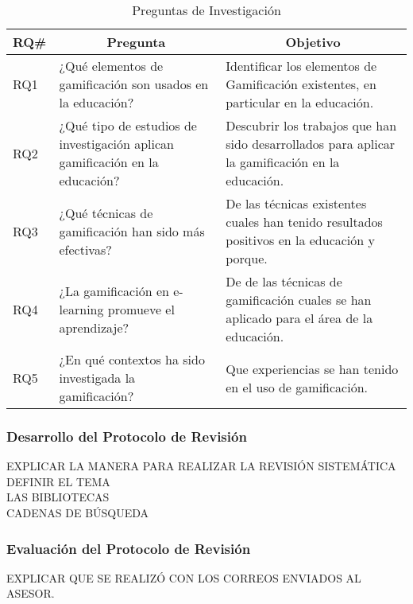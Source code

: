 \documentclass[fleqn,10pt]{SelfArx} %
\begin{document}
\begin{table}
    \begin{center}
        \caption{Preguntas de Investigación}
        \label{table:researchQuestions}
        \begin{tabular}{| p{0.6cm} | p{3.5cm} | p{3.5cm} |}
            \toprule
            \hline
            \multicolumn{1}{|c|}{\textbf{RQ\#}} & \multicolumn{1}{|c|}{\textbf{Pregunta}}  & \multicolumn{1}{|c|}{\textbf{Objetivo}} \\
            \hline
            RQ1 & ¿Qué elementos de gamificación son usados en la educación? & Identificar los elementos de Gamificación existentes, en particular en la educación. \\
            \hline
            RQ2 & ¿Qué tipo de estudios de investigación aplican gamificación en la educación? & Descubrir los trabajos que han sido desarrollados para aplicar la gamificación en la educación. \\
            \hline
            RQ3 & ¿Qué técnicas de gamificación han sido más efectivas? & De las técnicas existentes cuales han tenido resultados positivos en la educación y porque. \\
            \hline
            RQ4 & ¿La gamificación en e-learning promueve el aprendizaje? & De de las técnicas de gamificación cuales se han aplicado para el área de la educación.\\
            \hline
            RQ5 & ¿En qué contextos ha sido investigada la gamificación? & Que experiencias se han tenido en el uso de gamificación.\\
            \hline
        \end{tabular}
    \end{center}
\end{table}

    \subsubsection{Desarrollo del Protocolo de Revisión}
    EXPLICAR LA MANERA PARA REALIZAR LA REVISIÓN SISTEMÁTICA\\
    DEFINIR EL TEMA\\
    LAS BIBLIOTECAS\\
    CADENAS DE BÚSQUEDA\\

    \subsubsection{Evaluación del Protocolo de Revisión}
    EXPLICAR QUE SE REALIZÓ CON LOS CORREOS ENVIADOS AL ASESOR.\\
    
\end{document}
